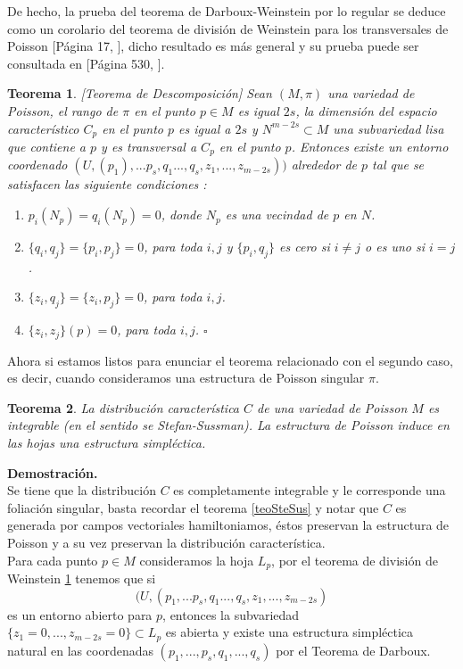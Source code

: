 \documentclass[a4paper,10pt]{book}
\newtheorem{teo}{Teorema}[chapter]
\begin{document}
De hecho, la prueba del teorema de Darboux-Weinstein por lo regular se deduce como un corolario del teorema de divisi\'on de Weinstein para los transversales de Poisson [P\'agina 17, \cite{Dufour}], dicho resultado es m\'as general y su prueba puede ser consultada en [P\'agina 530, \cite{Weinstein83}].
\begin{teo}\label{teoSplitig}[Teorema de Descomposici\'on]
Sean $(M,\pi)$ una variedad de Poisson, el rango de $\pi$ en el punto $p\in M$ es igual $2s$, la dimensi\'on del espacio caracter\'istico $C_{p}$ en el punto $p$ es igual a $2s$ y $N^{m-2s}\subset M$ una subvariedad lisa que contiene a $p$ y es transversal a $C_{p}$ en el  punto $p$. Entonces existe un entorno coordenado $(U,(p_{1}),...p_{s},q_{1}...,q_{s},z_{1},...,z_{m-2s}))$ alrededor de $p$ tal que se satisfacen las siguiente condiciones :
\begin{enumerate}
    \item $p_{i}(N_{p})=q_{i}(N_{p})=0$, donde $N_{p}$ es una vecindad de $p$ en $N$.  
    \item $\{q_{i},q_{j}\}=\{p_{i},p_{j}\}=0$, para toda $i,j$ y $\{p_{i},q_{j}\}$ es cero si $i\neq j$ o es uno si $i=j$.  
    \item $\{z_{i},q_{j}\}=\{z_{i},p_{j}\}=0$, para toda $i,j$.
    \item $\{z_{i},z_{j}\}(p)=0$, para toda $i,j$. \hfill $\square$
\end{enumerate}
\end{teo}
Ahora si estamos listos para enunciar el teorema relacionado con el segundo caso, es decir, cuando consideramos una estructura de Poisson singular $\pi$. 
\begin{teo}
La distribuci\'on caracter\'istica $C$ de una variedad de Poisson $M$ es integrable (en el sentido se Stefan-Sussman). La estructura de Poisson induce en las hojas una estructura simpl\'ectica.
\end{teo}
{\bfseries Demostraci\'on.}\\
Se tiene que la distribuci\'on $C$ es completamente integrable y le corresponde una foliaci\'on singular, basta recordar el teorema \ref{teoSteSus} y notar que $C$ es generada por campos vectoriales hamiltoniamos, \'estos preservan la estructura de Poisson y a su vez preservan la distribuci\'on caracter\'istica.\\

Para cada punto $p\in M$ consideramos la hoja $L_{p}$, por el teorema de divisi\'on de Weinstein \ref{teoSplitig} tenemos que si 
$$(U,(p_{1},...p_{s},q_{1}...,q_{s},z_{1},...,z_{m-2s})$$ 
es un entorno abierto para $p$, entonces la subvariedad $\{z_{1}=0,...,z_{m-2s}=0\}\subset L_{p}$ es abierta y existe una estructura simpl\'ectica natural en las coordenadas $(p_{1},...,p_{s},q_{1},...,q_{s})$ por el Teorema de Darboux.\\
\end{document}
